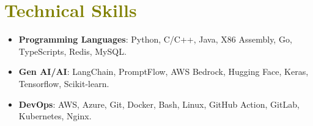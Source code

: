 
\section{\textcolor{olive}{\textbf{Technical Skills}}}

    \vspace{1.0mm}

    \begin{itemize}[leftmargin=0.15in, label={-}, itemsep=-2pt, topsep=0pt]
        \item \textbf{Programming Languages}: Python, C/C++, Java, X86 Assembly, Go, TypeScripts, Redis, MySQL.
        \item \textbf{Gen AI/AI}: LangChain, PromptFlow, AWS Bedrock, Hugging Face, Keras, Tensorflow, Scikit-learn.
        \item \textbf{DevOps}: AWS, Azure, Git, Docker, Bash, Linux, GitHub Action, GitLab, Kubernetes, Nginx.
    \end{itemize}